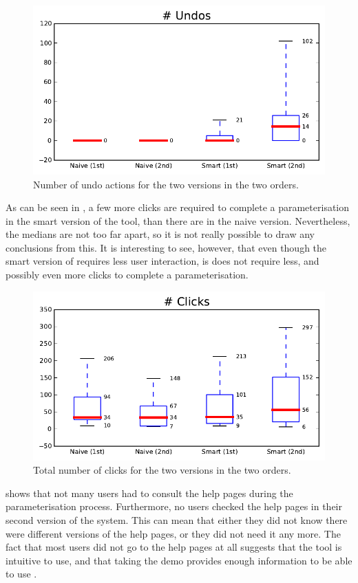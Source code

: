 \begin{figure}[h!]
\center
\includegraphics[width=.6\textwidth]{img/graphs/1a_10.pdf}
\caption{Number of undo actions for the two versions in the two orders.}
\end{figure}

As can be seen in , a few more clicks are required to complete a parameterisation in the smart version of the tool, than there are in the naive version. Nevertheless, the medians are not too far apart, so it is not really possible to draw any conclusions from this. It is interesting to see, however, that even though the smart version of \oframp{} requires less user interaction, is does not require less, and possibly even more clicks to complete a parameterisation.

\begin{figure}[h!]
\center
\includegraphics[width=.6\textwidth]{img/graphs/1a_04.pdf}
\caption{Total number of clicks for the two versions in the two orders.}
\end{figure}

 shows that not many users had to consult the help pages during the parameterisation process. Furthermore, no users checked the help pages in their second version of the system. This can mean that either they did not know there were different versions of the help pages, or they did not need it any more. The fact that most users did not go to the help pages at all suggests that the tool is intuitive to use, and that taking the demo provides enough information to be able to use \oframp.


